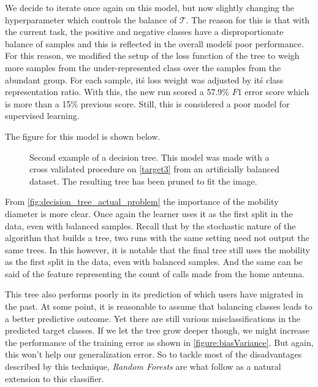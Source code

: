 We decide to iterate once again on this model, but now slightly changing the hyperparameter which controls the balance of $\mathcal{T}$.
The reason for this is that with the current task, the positive and negative classes have a disproportionate balance of samples and this is reflected in the overall model\'s poor performance.
For this reason, we modified the setup of the loss function of the tree to weigh more samples from the under-represented class over the samples from the abundant group.
For each sample, it\'s loss weight was adjusted by it\'s class representation ratio.
With this, the new run scored a 57.9\% $F1$ error score which is more than a 15\% previous score.
Still, this is considered a poor model for supervised learning.

The figure for this model is shown below.

\bigskip

\begin{figure}
	\centering
	\caption{ Second example of a decision tree. 
		This model was made with a cross validated procedure on \cref{target3} from an artificially balanced dataset. 
		The resulting tree has been pruned to fit the image.}
	\label{fig:decision_tree_actual_problem2}
\end{figure}


\smallskip

From \cref{fig:decision_tree_actual_problem} the importance of the mobility diameter is more clear.
Once again the learner uses it as the first split in the data, even with balanced samples.
Recall that by the stochastic nature of the algorithm that builds a tree, two runs with the same setting need not output the same trees.
In this however, it is notable that the final tree still uses the mobility as the first split in the data, even with balanced samples.
And the same can be said of the feature representing the count of calls made from the home antenna.

This tree also performs poorly in its prediction of which users have migrated in the past.
At some point, it is reasonable to assume that balancing classes leads to a better predictive outcome.
Yet there are still various misclassifications in the predicted target classes.
If we let the tree grow deeper though, we might increase the performance of the training error as shown in \cref{figure:biasVariance}.
But again, this won't help our generalization error.
So to tackle most of the disadvantages described by this technique, \textit{Random Forests} are what follow as a natural extension to this classifier.


